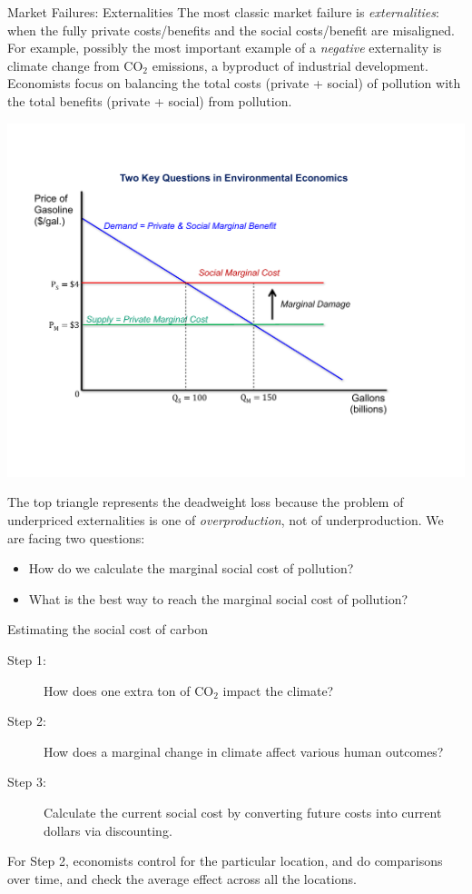 \documentclass[10pt]{extarticle}
\begin{document}
  \begin{problem}{Market Failures: Externalities}
    The most classic market failure is \textit{externalities}: when the fully private costs/benefits and the social costs/benefit are misaligned. For example, possibly the most important example of a \textit{negative} externality is climate change from CO$_2$ emissions, a byproduct of industrial development.\\

    Economists focus on balancing the total costs (private + social) of pollution with the total benefits (private + social) from pollution.
    \begin{center}
      \includegraphics[width=\textwidth]{climate_change_externalities.pdf}
    \end{center}
    The top triangle represents the deadweight loss because the problem of underpriced externalities is one of \textit{overproduction}, not of underproduction. We are facing two questions:
    \begin{itemize}
      \item How do we calculate the marginal social cost of pollution?
      \item What is the best way to reach the marginal social cost of pollution?
    \end{itemize}
    \begin{problem}{Estimating the social cost of carbon}
      \begin{description}
        \item[Step 1:] How does one extra ton of CO$_2$ impact the climate?
        \item[Step 2:] How does a marginal change in climate affect various human outcomes?
        \item[Step 3:] Calculate the current social cost by converting future costs into current dollars via discounting.
      \end{description}
      For Step 2, economists control for the particular location, and do comparisons over time, and check the average effect across all the locations.\\


\end{problem}
\end{problem}
\end{document}
